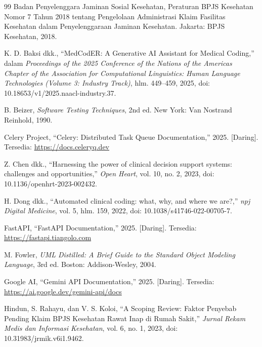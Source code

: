 \renewcommand{\bibname}{Referensi}

\begin{thebibliography}{99}
\sloppy
  Badan Penyelenggara Jaminan Sosial Kesehatan, Peraturan BPJS Kesehatan Nomor 7 Tahun 2018 tentang Pengelolaan Administrasi Klaim Fasilitas Kesehatan dalam Penyelenggaraan Jaminan Kesehatan. Jakarta: BPJS Kesehatan, 2018.

  K. D. Baksi dkk., ``MedCodER: A Generative AI Assistant for Medical Coding,'' dalam \textit{Proceedings of the 2025 Conference of the Nations of the Americas Chapter of the Association for Computational Linguistics: Human Language Technologies (Volume 3: Industry Track)}, hlm. 449--459, 2025, doi: 10.18653/v1/2025.naacl-industry.37.

  B. Beizer, \textit{Software Testing Techniques}, 2nd ed. New York: Van Nostrand Reinhold, 1990.

  Celery Project, ``Celery: Distributed Task Queue Documentation,'' 2025. [Daring]. Tersedia: \url{https://docs.celeryq.dev}

  Z. Chen dkk., ``Harnessing the power of clinical decision support systems: challenges and opportunities,'' \textit{Open Heart}, vol. 10, no. 2, 2023, doi: 10.1136/openhrt-2023-002432.

  H. Dong dkk., ``Automated clinical coding: what, why, and where we are?,'' \textit{npj Digital Medicine}, vol. 5, hlm. 159, 2022, doi: 10.1038/s41746-022-00705-7.

  FastAPI, ``FastAPI Documentation,'' 2025. [Daring]. Tersedia: \url{https://fastapi.tiangolo.com}

  M. Fowler, \textit{UML Distilled: A Brief Guide to the Standard Object Modeling Language}, 3rd ed. Boston: Addison-Wesley, 2004.

  Google AI, ``Gemini API Documentation,'' 2025. [Daring]. Tersedia: \url{https://ai.google.dev/gemini-api/docs}

  Hindun, S. Rahayu, dan V. S. Koloi, ``A Scoping Review: Faktor Penyebab Pending Klaim BPJS Kesehatan Rawat Inap di Rumah Sakit,'' \textit{Jurnal Rekam Medis dan Informasi Kesehatan}, vol. 6, no. 1, 2023, doi: 10.31983/jrmik.v6i1.9462.


\end{thebibliography}
